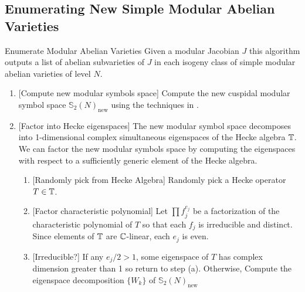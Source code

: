 \documentclass{article}
\begin{document}

\subsection{Enumerating New Simple Modular Abelian Varieties}

\begin{algorithm}{Enumerate Modular Abelian Varieties}
    \label{alg:new_simple_subs}
    Given a modular Jacobian $J$ this algorithm outputs a list of
    abelian subvarieties of $J$ in each isogeny class of simple modular
    abelian varieties of level $N$.
    \begin{enumerate}
        \item{} [Compute new modular symbols space]
            Compute the new cuspidal modular symbol space
            $\mathbb{S}_2(N)_\mathrm{new}$ using the techniques in \cite[\S
            8]{stein:modform}.
        \item{} [Factor into Hecke eigenspaces]
            The new modular symbol space decomposes into 1-dimensional complex
            simultaneous eigenspaces of the Hecke algebra $\mathbb{T}$. We can factor
            the new modular symbols space by computing the eigenspaces with
            respect to a sufficiently generic element of the Hecke algebra.
            \begin{enumerate}
                \item{} [Randomly pick from Hecke Algebra]
                    Randomly pick a Hecke operator $T\in \mathbb{T}$.
                \item{} [Factor characteristic polynomial]
                    Let $\prod f_j ^{e_j}$ be a factorization of the characteristic
                    polynomial of $T$ so that each $f_j$ is irreducible and
                    distinct. Since elements of $\mathbb{T}$ are $\mathbb{C}$-linear, each
                    $e_j$ is even.
                \item{} [Irreducible?]
                    If any $e_j/2 > 1$, some eigenspace of $T$ has complex
                    dimension greater than 1 so return to step (a). Otherwise,
                    Compute the eigenspace decomposition $\{W_{k}\}$ of
                    $\mathbb{S}_2(N)_\mathrm{new}$
            \end{enumerate}
    \end{enumerate}
\end{algorithm}
\end{document}
